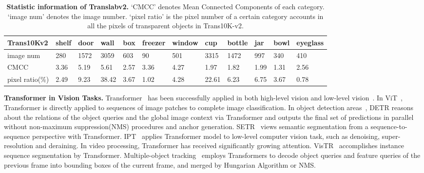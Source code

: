 \documentclass{article}
\begin{document}
\begin{table*}[t]
\centering
 \scalebox{1.1}
 {\small\begin{tabular}{p{60pt}<{\centering}p{17pt}<{\centering}p{17pt}<{\centering}p{17pt}<{\centering}p{17pt}<{\centering}p{17pt}<{\centering}p{30pt}<{\centering}p{17pt}<{\centering}p{17pt}<{\centering}p{17pt}<{\centering}p{17pt}<{\centering}p{22pt}<{\centering}}
\toprule

Trans10Kv2 &  shelf & door & wall & box &  freezer & window & cup & bottle  & jar&  bowl & eyeglass\\ \midrule
image num & 280 & 1572 & 3059 & 603 & 90 & 501 &  3315 & 1472 & 997 & 340 & 410 \\
CMCC & 3.36  & 5.19 & 5.61 & 2.57 & 3.36 & 4.27 &  1.97 & 1.82 & 1.99 & 1.31& 2.56  \\
pixel ratio(\%) & 2.49  & 9.23  & 38.42  & 3.67   & 1.02 & 4.28  &  22.61  & 6.23   & 6.75  & 3.67& 0.78   \\
\bottomrule
\end{tabular} }
\vspace{2mm}
\caption{\textbf{Statistic information of Translabv2.} `CMCC' denotes Mean Connected Components of each category. `image num' denotes the image number. `pixel ratio' is the pixel number of a certain category accounts in all the pixels of transparent objects in Trans10K-v2.}
\label{tab:stat}
\vspace{-20pt}
\end{table*}

\textbf{Transformer in Vision Tasks.}
Transformer~\cite{vaswani2017attention} has been successfully applied in both high-level vision and low-level vision~\cite{han2020survey}. In  ViT~\cite{dosovitskiy2020image}, Transformer is directly applied to sequences of image patches to complete image classification. In object detection areas~\cite{DETR,deformdetr}, DETR reasons about the relations of the object queries and the global image context via Transformer and outputs the final set of predictions in parallel without non-maximum suppression(NMS) procedures and anchor generation.
SETR~\cite{zheng2020setr} views semantic segmentation from a sequence-to-sequence perspective with Transformer.
IPT~\cite{chen2020pre} applies Transformer model to low-level computer vision task, such as denoising, super-resolution and deraining. In video processing, Transformer has received significantly growing attention.  VisTR~\cite{wang2020end} accomplishes instance sequence segmentation by Transformer. Multiple-object tracking~\cite{transtrack,trackformer} employs Transformers to decode object queries and feature queries of the previous frame into bounding boxes of the current frame, and merged by Hungarian Algorithm or NMS.
\end{document}
